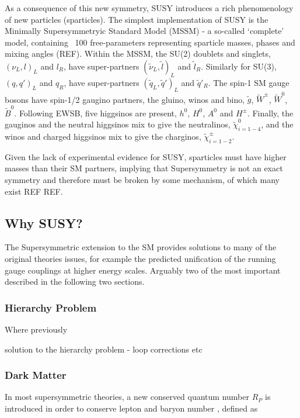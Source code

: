 As a consequence of this new symmetry, SUSY introduces a rich phenomenology of
new particles (sparticles). The simplest implementation of SUSY is the
Minimally
Supersymmetryic Standard Model (MSSM) - a so-called `complete' model, containing
~100 free-parameters representing sparticle masses, phases and mixing angles 
(REF).
Within the MSSM, the SU(2) doublets and singlets, $(\nu_L, l)_L$ and $l_R$,
have super-partners $(\tilde{\nu}_L, \tilde{l})_L$ and $\tilde{l}_R$. Similarly
for SU(3), $(q, q')_L$ and $q_R$,
have super-partners $(\tilde{q}_L, \tilde{q}')_L$ and $\tilde{q}'_R$. The
spin-1 SM gauge bosons have spin-1/2 gaugino partners, the gluino, winos and
bino, $\tilde{g}$, $\tilde{W}^{\pm}$, $\tilde{W}^0$, $\tilde{B}^0$.
Following EWSB, five higgsinos are present, $h^0$, $H^0$, $A^0$ and
$H^{\pm}$. Finally, the gauginos and the neutral higgsinos mix to give the
neutralinos, $\tilde{\chi}^0_{i=1-4}$, and the winos and charged higgsinos mix
to give the charginos, $\tilde{\chi}^{\pm}_{i=1-2}$.

Given the lack of experimental evidence for SUSY, sparticles must
have higher masses than their SM partners, implying that Supersymmetry is not
an exact symmetry and therefore must be broken by some mechanism, of which many
exist REF REF.



\subsection{Why SUSY?}
The Supersymmetric extension to the SM provides solutions to many of the
original theories issues, for example the predicted unification of the running
gauge couplings at higher energy scales. Arguably two of the most important
described in the following two sections.

\subsubsection{Hierarchy Problem}
Where previously 

solution to the hierarchy problem - loop corrections etc

\subsubsection{Dark Matter}
In most supersymmetric theories, a new conserved quantum number $R_P$
is introduced in order to conserve lepton and baryon number
\cite{Farrar1978575}, defined as

